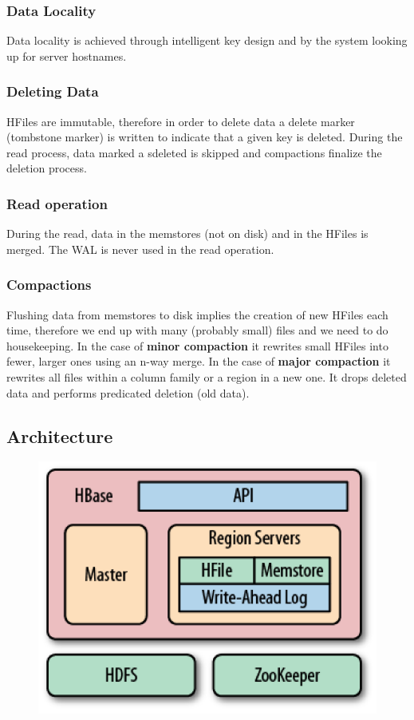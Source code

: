 		\subsubsection{Data Locality}
		Data locality is achieved through intelligent key design and by the system looking up for server hostnames.
		\subsubsection{Deleting Data}
		HFiles are immutable, therefore in order to delete data a delete marker (tombstone marker) is written to indicate that a given key is deleted.\newline
		During the read process, data marked a sdeleted is skipped and compactions finalize the deletion process.
		\subsubsection{Read operation}
		During the read, data in the memstores (not on disk) and in the HFiles is merged. The WAL is never used in the read operation.
		\subsubsection{Compactions}
		Flushing data from memstores to disk implies the creation of new HFiles each time, therefore we end up with many (probably small) files and we need to do housekeeping.\newline
		In the case of \textbf{minor compaction} it rewrites small HFiles into fewer, larger ones using an n-way merge.\newline
		In the case of \textbf{major compaction} it rewrites all files within a column family or a region in a new one. It drops deleted data and performs predicated deletion (old data).
	\subsection{Architecture}
		\begin{figure}[H]
			\centering
			\includegraphics[width=0.5\linewidth]{images/hbasearch.png}
		\end{figure}

